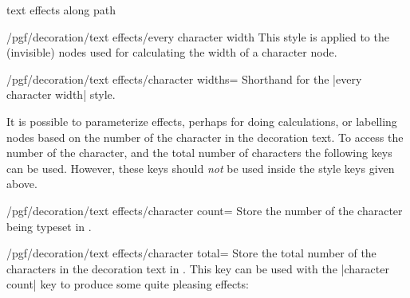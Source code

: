 \begin{decoration}{text effects along path}
    \begin{stylekey}{/pgf/decoration/text effects/every character width}
        This style is applied to the (invisible) nodes used for calculating the
        width of a character node.
    \end{stylekey}

    \begin{key}{/pgf/decoration/text effects/character widths=}
        Shorthand for the |every character width| style.
\begin{codeexample}[]
\end{codeexample}
    \end{key}

    It is possible to parameterize effects, perhaps for doing calculations, or
    labelling nodes based on the number of the character in the decoration
    text. To access the number of the character, and the total number of
    characters the following keys can be used. However, these keys should
    \emph{not} be used inside the style keys given above.

    \begin{key}{/pgf/decoration/text effects/character count=}
        Store the number of the character being typeset in .
\begin{codeexample}[]
\end{codeexample}
    \end{key}

    \begin{key}{/pgf/decoration/text effects/character total=}
        Store the total number of the characters in the decoration text in
        . This key can be used with the |character count| key to
        produce some quite pleasing effects:
\begin{codeexample}[preamble={\usetikzlibrary{math}}]
\begin{tikzpicture}[decoration={text effects along path,
  text={text effects along path!},
  text effects/.cd,
    character count=\i, character total=\n,
    characters={text along path, evaluate={\c=\i/\n*100;},
      text=orange!\c!blue, scale=\i/\n+0.5}}]


\end{tikzpicture}
\end{codeexample}
\end{key}
\end{decoration}
